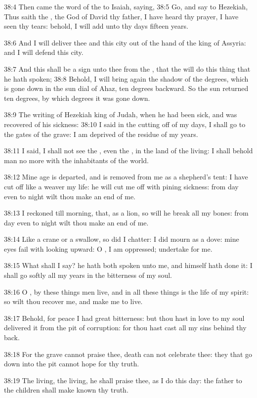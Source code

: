 38:4 Then came the word of the \LORD to Isaiah, saying, 38:5 Go, and
say to Hezekiah, Thus saith the \LORD, the God of David thy father, I
have heard thy prayer, I have seen thy tears: behold, I will add unto
thy days fifteen years.

38:6 And I will deliver thee and this city out of the hand of the king
of Assyria: and I will defend this city.

38:7 And this shall be a sign unto thee from the \LORD, that the \LORD
will do this thing that he hath spoken; 38:8 Behold, I will bring
again the shadow of the degrees, which is gone down in the sun dial of
Ahaz, ten degrees backward. So the sun returned ten degrees, by which
degrees it was gone down.

38:9 The writing of Hezekiah king of Judah, when he had been sick, and
was recovered of his sickness: 38:10 I said in the cutting off of my
days, I shall go to the gates of the grave: I am deprived of the
residue of my years.

38:11 I said, I shall not see the \LORD, even the \LORD, in the land of
the living: I shall behold man no more with the inhabitants of the
world.

38:12 Mine age is departed, and is removed from me as a shepherd's
tent: I have cut off like a weaver my life: he will cut me off with
pining sickness: from day even to night wilt thou make an end of me.

38:13 I reckoned till morning, that, as a lion, so will he break all
my bones: from day even to night wilt thou make an end of me.

38:14 Like a crane or a swallow, so did I chatter: I did mourn as a
dove: mine eyes fail with looking upward: O \LORD, I am oppressed;
undertake for me.

38:15 What shall I say? he hath both spoken unto me, and himself hath
done it: I shall go softly all my years in the bitterness of my soul.

38:16 O \LORD, by these things men live, and in all these things is the
life of my spirit: so wilt thou recover me, and make me to live.

38:17 Behold, for peace I had great bitterness: but thou hast in love
to my soul delivered it from the pit of corruption: for thou hast cast
all my sins behind thy back.

38:18 For the grave cannot praise thee, death can not celebrate thee:
they that go down into the pit cannot hope for thy truth.

38:19 The living, the living, he shall praise thee, as I do this day:
the father to the children shall make known thy truth.


